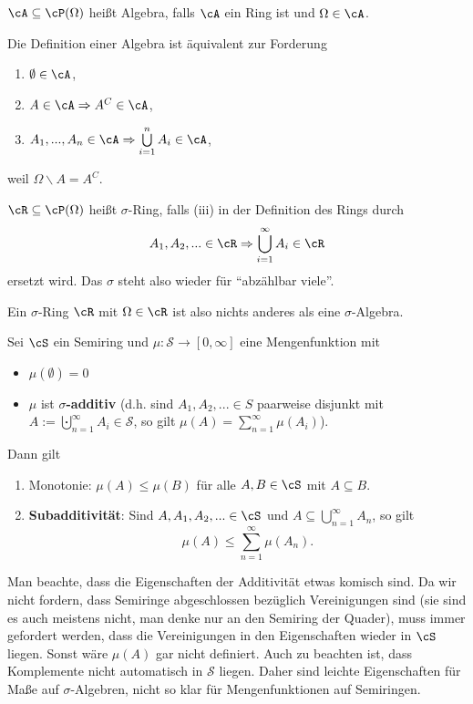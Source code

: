 \begin{deff}
	$\cA \subseteq \cP(\Omega)$ heißt Algebra, falls $\cA$ ein Ring ist und $\Omega \in \cA$.
\end{deff}
Die Definition einer Algebra ist \"aquivalent zur Forderung
	\begin{enumerate}[label=(\roman*)]
		\item $\emptyset \in \cA$,
		\item $A \in \cA \Rightarrow A^C \in \cA$,
		\item $A_1,...,A_n \in \cA \Rightarrow \bigcup\limits_{i = 1}^{n} A_i \in \cA$,
	\end{enumerate}
weil $\Omega\backslash A=A^C$.
\begin{deff}
	$\cR \subseteq \cP(\Omega)$ heißt $\sigma$-Ring, falls (iii) in der Definition des Rings durch 
	\begin{align*}
		A_1,A_2,... \in \cR \Rightarrow \bigcup\limits_{i = 1}^{\infty} A_i \in \cR 
	\end{align*}
	ersetzt wird. Das $\sigma$ steht also wieder für \enquote{abzählbar viele}.
\end{deff}
	Ein $\sigma$-Ring $\cR$ mit $\Omega \in \cR$ ist also nichts anderes als eine $\sigma$-Algebra.
\begin{lemma}\label{Rechenregeln}
	Sei $\cS$ ein Semiring und $\mu \! : \mathcal S \rightarrow [0, \infty] $ eine Mengenfunktion mit
	\begin{itemize}
		\item $\mu(\emptyset) = 0$
		\item $\mu$ ist \textbf{$\sigma$-additiv} (d.h. sind $A_1, A_2, ... \in S$ paarweise disjunkt mit $A:=\bigcupdot_{n=1}^\infty A_i\in \mathcal S$, so gilt $\mu(A)=\sum_{n=1}^\infty \mu(A_i)$).
	\end{itemize}
	Dann gilt
	\begin{enumerate}[label=(\roman*)]
		\item \label{MonotQuasiMass} Monotonie: $\mu(A) \leq \mu(B)$ für alle $A,B \in \cS$ mit $ A \subseteq B$.
		\item  \glqq \textbf{Subadditivit\"at}\grqq: Sind $A,A_1,A_2,... \in \cS $ und $A\subseteq \bigcup\limits_{n=1}^{\infty} A_n$, so gilt\[ \mu(A) \leq \sum\limits_{n = 1}^{\infty} \mu(A_n). \]
	\end{enumerate}
\end{lemma}
Man beachte, dass die Eigenschaften der Additivit\"at etwas komisch sind. Da wir nicht fordern, dass Semiringe abgeschlossen bez\"uglich Vereinigungen sind (sie sind es auch meistens nicht, man denke nur an den Semiring der Quader), muss immer gefordert werden, dass die Vereinigungen in den Eigenschaften wieder in $\cS$ liegen. Sonst w\"are $\mu(A)$ gar nicht definiert. Auch zu beachten ist, dass Komplemente nicht automatisch in $\mathcal S$ liegen. Daher sind leichte Eigenschaften f\"ur Ma\ss e auf $\sigma$-Algebren, nicht so klar f\"ur Mengenfunktionen auf Semiringen.

